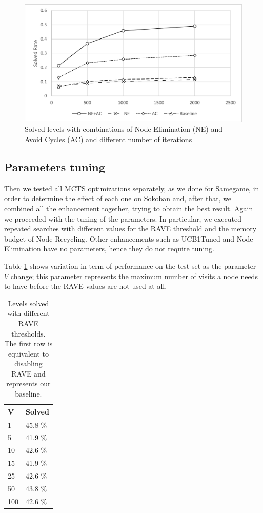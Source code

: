 \begin{figure}[!h]
    \centering
    \includegraphics[width=0.9\linewidth]{pictures/SokobanNEACSolved.png}
    \caption[Node Elimination and Avoid Cycles solved levels]{Solved levels with combinations of Node Elimination (NE) and Avoid Cycles (AC) and different number of iterations}
    \label{fig:SokobanNodeEliminationSolved}
\end{figure}
\clearpage

\subsection{Parameters tuning}
\medskip\noindent
Then we tested all MCTS optimizations separately, as we done for Samegame, in order to determine the effect of each one on Sokoban and, after that, we combined all the enhancement together, trying to obtain the best result. Again we proceeded with the tuning of the parameters. In particular, we executed repeated searches with different values for the RAVE threshold and the memory budget of Node Recycling. Other enhancements such as UCB1Tuned and Node Elimination have no parameters, hence they do not require tuning.

\medskip\noindent
Table \ref{tab:sokoban_tuningrave} shows variation in term of performance on the test set as the parameter $V$ change; this parameter represents the maximum number of visits a node needs to have before the RAVE values are not used at all.

\begin{table}[!h]
    \centering
    \begin{tabular}{l|l}
        V & Solved \\
        \hline 
        1 & 45.8 \% \\
        5 & 41.9 \% \\
        10 & 42.6 \% \\
        15 & 41.9 \% \\
        25 & 42.6 \% \\
        50 & 43.8 \% \\
        100 & 42.6 \% \\
    \end{tabular}
    \caption[RAVE thresholds evaluation]{Levels solved with different RAVE thresholds. The first row is equivalent to disabling RAVE and represents our baseline.}
    \label{tab:sokoban_tuningrave}
\end{table}

